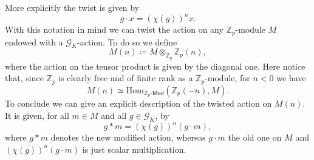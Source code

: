 \begin{ntt}[]
	More explicitly the twist is given by
	\begin{equation*}
		g \cdot x = \left( \chi(g) \right)^n x
	.\end{equation*}
	With this notation in mind we can twist the action on any $\mathbb{Z}_{p}$-module
	$M$ endowed with a $\mathscr{G}_K$-action.
	To do so we define
	\begin{equation*}
		M(n) \coloneqq M \otimes_{\mathbb{Z}_{p}} \mathbb{Z}_{p}(n)
	,\end{equation*}
	where the action on the tensor product is given by the diagonal one.
	Here notice that, since $\mathbb{Z}_{p}$ is clearly free and of finite rank as
	a $\mathbb{Z}_{p}$-module, for $n < 0$ we have
	\begin{equation*}
		M(n) \simeq \mathrm{Hom}_{ \mathbb{Z}_{p}\text{-}\mathsf{Mod} }
		\left( \mathbb{Z}_{p}(-n), M\right)
	.\end{equation*}
	To conclude we can give an explicit description of the twisted action on $M(n)$.
	It is given, for all $m \in M$ and all $g \in \mathscr{G}_K$, by
	\begin{equation*}
		g * m = (\chi(g))^n (g \cdot m)
	,\end{equation*}
	where $g * m$ denotes the new modified action, whereas $g \cdot m$ the old one on $M$
	and $(\chi(g))^n (g \cdot m)$ is just scalar multiplication.
\end{ntt}


